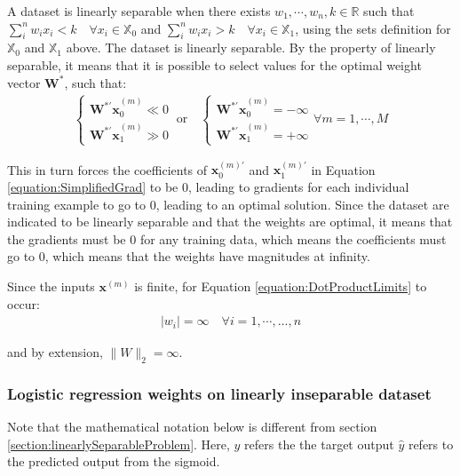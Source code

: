 \documentclass[a4paper,12pt]{article}
\begin{document}
A dataset is linearly separable when there exists $w_1, \cdots, w_n, k \in \mathbb{R}$ such that $ \sum_i^n w_i x_i < k \quad \forall x_i \in \mathbb{X}_0 $ and $ \sum_i^n w_i x_i > k \quad \forall x_i \in \mathbb{X}_1 $, using the sets definition for $\mathbb{X}_0$ and $\mathbb{X}_1$ above. The dataset is linearly separable. By the property of linearly separable, it means that it is possible to select values for the optimal weight vector $\mathbf{W}^{*}$, such that:
\begin{align}
\label{equation:DotProductLimits}
\begin{cases}
\mathbf{W^{*'}x}_0^{(m)} \ll 0\\
\mathbf{W^{*'}x}_1^{(m)} \gg 0
\end{cases} \ \text{or} \quad
\begin{cases}
\mathbf{W^{*'}x}_0^{(m)} = - \infty \\
\mathbf{W^{*'}x}_1^{(m)} = + \infty
\end{cases}
\forall m = 1, \cdots, M
\end{align}

This in turn forces the coefficients of $\mathbf{x}_0^{(m)'}$ and $\mathbf{x}_1^{(m)'}$ in Equation \ref{equation:SimplifiedGrad} to be 0, leading to gradients for each individual training example to go to 0, leading to an optimal solution. Since the dataset are indicated to be linearly separable and that the weights are optimal, it means that the gradients must be 0 for any training data, which means the coefficients must go to 0, which means that the weights have magnitudes at infinity. 

Since the inputs $\mathbf{x}^{(m)}$ is finite, for Equation \ref{equation:DotProductLimits} to occur:
\begin{align}
|w_i| = \infty \quad \forall i = 1, \cdots, ..., n
\end{align}

and by extension, $\|W\|_2 = \infty$.

\subsubsection{Logistic regression weights on linearly inseparable dataset}
\label{section:BoundedSection}

Note that the mathematical notation below is different from section \ref{section:linearlySeparableProblem}. 
Here, 
$y$ refers the the target output
$\hat{y}$ refers to the predicted output from the sigmoid. 
\end{document}
